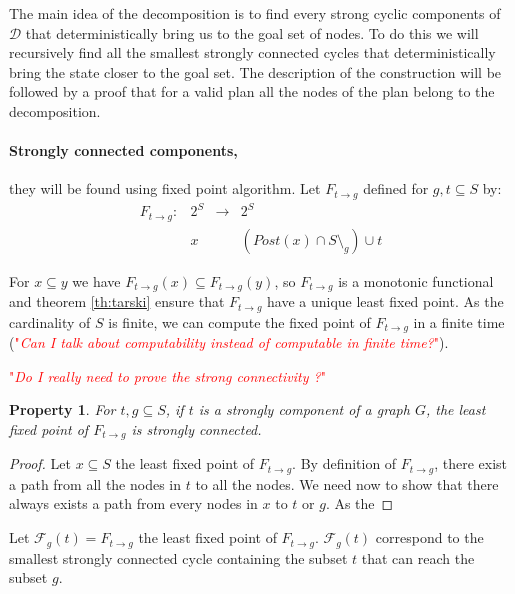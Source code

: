 \documentclass{article}
\newcommand\comment[1]{\textcolor{red}{"\textit{#1}"}}
\newtheorem{property}{Property}
\theoremstyle{named}
\newcommand{\propsymbol}{\( \blacklozenge \)}
\newenvironment{prop}[0]
    {\begin{samepage}
    \begin{property}
    \renewcommand{\qedsymbol}{\propsymbol}\pushQED{\qed}
    }
    {
    \popQED %
    \end{property} 
    \end{samepage}
    }
\begin{document}
The main idea of the decomposition is to find every strong cyclic components of $\mathcal{D}$ that deterministically bring us to the goal set of nodes.
To do this we will recursively find all the smallest strongly connected cycles that deterministically bring the state closer to the goal set.
The description of the construction will be followed by a proof that for a valid plan  all the nodes of the plan belong to the decomposition.

\paragraph{Strongly connected components,} they will be found using fixed point algorithm.
Let $F_{t \rightarrow g}$ defined for $g,t \subseteq S$ by:
\begin{equation}
\begin{array}{llll}
F_{t \rightarrow g} :& 2^S & \rightarrow & 2^S\\
 & x &  & (Post(x) \cap S \setminus_g) \cup t
\end{array}
\end{equation}


For $x \subseteq y$ we have $F_{t \rightarrow g} (x) \subseteq F_{t \rightarrow g}(y)$, so $F_{t \rightarrow g}$ is a monotonic functional and theorem \ref{th:tarski} ensure that $F_{t \rightarrow g}$ have a unique least fixed point.
As the cardinality of $S$ is finite, we can compute the fixed point of $F_{t \rightarrow g}$ in a finite time
(\comment{Can I talk about computability instead of computable in finite time?}).

\comment{Do I really need to prove the strong connectivity ?}
\begin{prop}
For $t,g \subseteq S$, if $t$ is a strongly component of a graph $G$, the least fixed point of $F_{t \rightarrow g}$ is strongly connected.
\end{prop}

\begin{proof} 
Let $x \subseteq S$ the least fixed point of $F_{t \rightarrow g}$.
By definition of $F_{t \rightarrow g}$, there exist a path from all the nodes in $t$ to all the nodes.
We need now to show that there always exists a path from every nodes in $x$ to $t$ or $g$.
As the 
\end{proof}

Let $\mathcal{F}_g(t) = F_{t \rightarrow g}$ the least fixed point of $F_{t \rightarrow g}$.
$\mathcal{F}_g(t)$ correspond to the smallest strongly connected cycle containing the subset $t$ that can reach the subset $g$.
\end{document}
